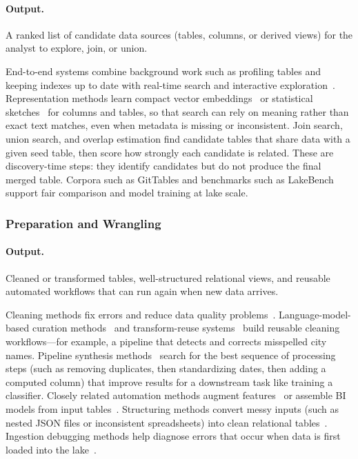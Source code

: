 \documentclass[sigconf]{acmart}
\begin{document}
\paragraph{Output.} A ranked list of candidate data sources (tables, columns, or derived views) for the analyst to explore, join, or union.

End-to-end systems combine background work such as profiling tables and keeping indexes up to date with real-time search and interactive exploration~\cite{10.14778/3685800.3685880,11112882,10.14778/3659437.3659461}.
Representation methods learn compact vector embeddings~\cite{10.14778/3587136.3587146,11113165} or statistical sketches~\cite{11113110} for columns and tables, so that search can rely on meaning rather than exact text matches, even when metadata is missing or inconsistent.
Join search, union search, and overlap estimation find candidate tables that share data with a given seed table, then score how strongly each candidate is related. These are discovery-time steps: they identify candidates but do not produce the final merged table.
Corpora such as GitTables and benchmarks such as LakeBench~\cite{10.14778/3659437.3659448} support fair comparison and model training at lake scale.


\subsubsection{Preparation and Wrangling}
\paragraph{Output.} Cleaned or transformed tables, well-structured relational views, and reusable automated workflows that can run again when new data arrives.

Cleaning methods fix errors and reduce data quality problems~\cite{10.14778/3675034.3675051}. Language-model-based curation methods~\cite{10.14778/3574245.3574258,10.14778/3611540.3611624} and transform-reuse systems~\cite{10.14778/3611540.3611628} build reusable cleaning workflows---for example, a pipeline that detects and corrects misspelled city names.
Pipeline synthesis methods~\cite{10.1145/3698831,10.1145/3588945} search for the best sequence of processing steps (such as removing duplicates, then standardizing dates, then adding a computed column) that improve results for a downstream task like training a classifier. Closely related automation methods augment features~\cite{11113027} or assemble BI models from input tables~\cite{10.14778/3603581.3603596}.
Structuring methods convert messy inputs (such as nested JSON files or inconsistent spreadsheets) into clean relational tables~\cite{10.14778/3626292.3626294,10.1145/3665252.3665269,10.14778/3681954.3682019}. Ingestion debugging methods help diagnose errors that occur when data is first loaded into the lake~\cite{10.14778/3611540.3611595}.
\end{document}

